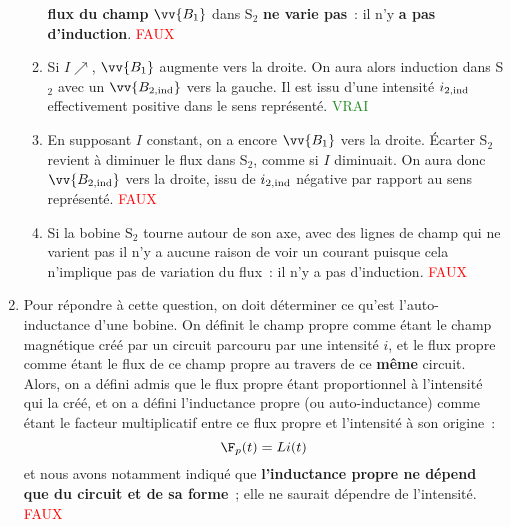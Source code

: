 \documentclass[a4paper, 10pt, final, garamond]{book}
\begin{document}
\begin{enumerate}
\begin{enumerate}
		            \textbf{flux du champ} $\vv{B_1}$ dans S$_2$ \textbf{ne varie
			            pas}~: il n'y \textbf{a pas d'induction}.
		            \hfill \textcolor{red}{FAUX}
		      \item Si $I \nearrow$, $\vv{B_1}$ augmente vers la droite. On aura
		            alors induction dans S$_2$ avec un $\vv{B_{2, \rm ind}}$ vers la
		            gauche. Il est issu d'une intensité $i_{2, \rm ind}$
		            effectivement positive dans le sens représenté.
		            \hfill \textcolor{ForestGreen}{VRAI}
		      \item En supposant $I$ constant, on a encore $\vv{B_1}$ vers la
		            droite. Écarter S$_2$ revient à diminuer le flux dans S$_2$,
		            comme si $I$ diminuait. On aura donc $\vv{B_{2, \rm ind}}$ vers
		            la droite, issu de $i_{2, \rm ind}$ négative par rapport au sens
		            représenté.
		            \hfill \textcolor{red}{FAUX}
		      \item Si la bobine S$_2$ tourne autour de son axe, avec des lignes
		            de champ qui ne varient pas il n'y a aucune raison de voir un
		            courant puisque cela n'implique pas de variation du flux~: il
		            n'y a pas d'induction.
		            \hfill \textcolor{red}{FAUX}
	      \end{enumerate}
	\item Pour répondre à cette question, on doit déterminer ce qu'est
	      l'auto-inductance d'une bobine. On définit le champ propre comme étant
	      le champ magnétique créé par un circuit parcouru par une intensité $i$,
	      et le flux propre comme étant le flux de ce champ propre au travers de
	      ce \textbf{même} circuit. Alors, on a défini admis que le flux propre
	      étant proportionnel à l'intensité qui la créé, et on a défini
	      l'inductance propre (ou auto-inductance) comme étant le facteur
	      multiplicatif entre ce flux propre et l'intensité à son origine~:
	      \[
		      \F_p (t) = Li(t)
	      \]
	      et nous avons notamment indiqué que \textbf{l'inductance propre ne
		      dépend que du circuit et de sa forme}~; elle ne saurait dépendre de
	      l'intensité.
	      \hfill \textcolor{red}{FAUX}
\end{enumerate}
\end{document}
